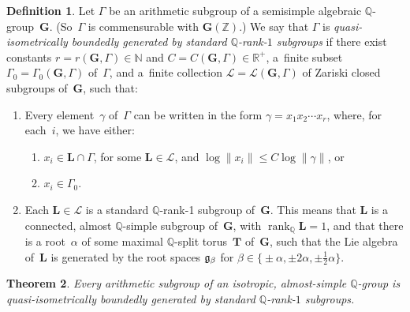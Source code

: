 \documentclass[pdftex]{sigma}
\newcommand{\NN}{\mathbb{N}}
\newcommand{\QQ}{\mathbb{Q}}
\newcommand{\RR}{\mathbb{R}}
\newcommand{\ZZ}{\mathbb{Z}}
\newcommand{\Ga}{\mathbf{G}}
\newcommand{\La}{\mathbf{L}}
\newcommand{\Ta}{\mathbf{T}}
\DeclareMathOperator{\rank}{rank}
\newcommand{\Lie}[1]{\lowercase{\mathfrak{#1}}}
\newcommand{\subgroups}{\mathcal{L}}
\numberwithin{equation}{section}
\newtheorem{thm}{Theorem}[section]
\theoremstyle{definition}
\newtheorem{defn}[thm]{Definition}
\begin{document}
\begin{defn} \label{QIBddGenDefn}
Let $\Gamma$ be an arithmetic subgroup of a semisimple algebraic $\QQ$-group~$\Ga$. (So~$\Gamma$ is commensurable with $\Ga(\ZZ)$.) We say that $\Gamma$ is \emph{quasi-isometrically boundedly generated by standard $\QQ$-rank-$1$ subgroups} if there exist constants $r = r(\Ga,\Gamma) \in \NN$ and $C = C(\Ga,\Gamma) \in \RR^+$, a~finite subset $\Gamma_0 = \Gamma_0(\Ga,\Gamma)$ of~$\Gamma$, and a~finite collection $\subgroups = \subgroups(\Ga,\Gamma)$ of Zariski closed subgroups of~$\Ga$, such that:
\begin{enumerate}\itemsep=0pt
\item %
	 Every element~$\gamma$ of~$\Gamma$ can be written in the form $\gamma = x_1 x_2 \cdots x_r$, where, for each~$i$, we have either:
\begin{enumerate}\itemsep=0pt
\item %
$x_i \in \La \cap \Gamma$, for some $\La \in \subgroups$, and $\log \|x_i\| \le C \log \|\gamma\|$, or
\item $x_i \in \Gamma_0$.
\end{enumerate}
\item %
Each $\La \in \subgroups$ is a standard $\QQ$-rank-1 subgroup of~$\Ga$. This means that $\La$ is a connected, almost $\QQ$-simple subgroup of~$\Ga$, with $\rank_\QQ \La = 1$, and that there is a root~$\alpha$ of some maximal $\QQ$-split torus~$\Ta$ of~$\Ga$, such that the Lie algebra of~$\La$ is generated by the root spaces $\Lie G_\beta$ for $\beta \in \big\{{\pm} \alpha, \pm 2\alpha, \pm \frac{1}{2} \alpha \big\}$.
\end{enumerate}
\end{defn}

\begin{thm} \label{QIBddGenByRank1}Every arithmetic subgroup of an isotropic, almost-simple $\QQ$-group is quasi-isometrically boundedly generated by standard $\QQ$-rank-$1$ subgroups.
\end{thm}
\end{document}
